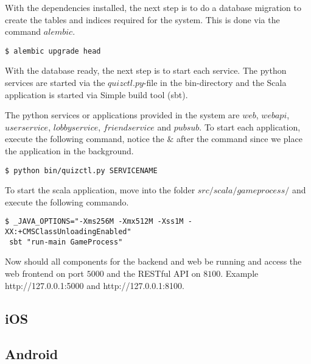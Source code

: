 With the dependencies installed, the next step is to do a database migration to create the tables and indices required for the system. This is done via the command $alembic$.

\begin{verbatim}
$ alembic upgrade head
\end{verbatim}

With the database ready, the next step is to start each service. The python services are started via the $quizctl.py$-file in the bin-directory and the Scala application is started via Simple build tool (sbt).

The python services or applications provided in the system are $web$, $webapi$, $userservice$, $lobbyservice$, $friendservice$ and $pubsub$.
To start each application, execute the following command, notice the $\&$ after the command since we place the application in the background.

\begin{verbatim}
$ python bin/quizctl.py SERVICENAME
\end{verbatim}

To start the scala application, move into the folder $src/scala/gameprocess/$ and execute the following commando.
\begin{verbatim}
$ _JAVA_OPTIONS="-Xms256M -Xmx512M -Xss1M -XX:+CMSClassUnloadingEnabled"
 sbt "run-main GameProcess"
\end{verbatim}

Now should all components for the backend and web be running and access the web frontend on port $5000$ and the RESTful API on $8100$. Example http://127.0.0.1:5000 and http://127.0.0.1:8100.

\subsection{iOS}

\subsection{Android}